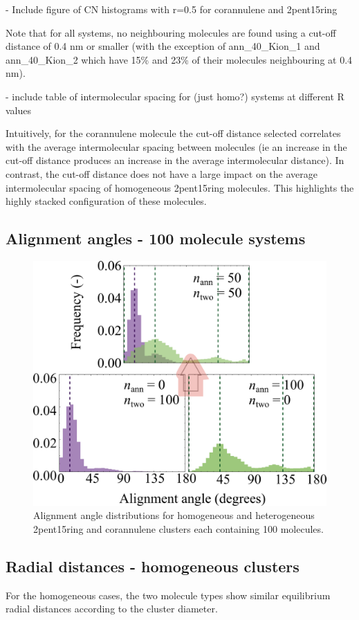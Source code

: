 - Include figure of CN histograms with r=0.5 for corannulene and 2pent15ring

Note that for all systems, no neighbouring molecules are found using a cut-off distance of 0.4 nm or smaller (with the exception of ann\_40\_Kion\_1 and ann\_40\_Kion\_2 which have 15\% and 23\% of their molecules neighbouring at 0.4 nm).

- include table of intermolecular spacing for (just homo?) systems at different R values

Intuitively, for the corannulene molecule the cut-off distance selected correlates with the average intermolecular spacing between molecules (ie an increase in the cut-off distance produces an increase in the average intermolecular distance). %
In contrast, the cut-off distance does not have a large impact on the average intermolecular spacing of homogeneous 2pent15ring molecules.  This highlights the highly stacked configuration of these molecules.



\subsection{Alignment angles - 100 molecule systems}
%
\begin{figure}[!tbh]
\centering
\includegraphics[width=0.5\linewidth]{Figures/alignment_angle_hetero_SI_draft.png}
\caption{Alignment angle distributions for homogeneous and heterogeneous 2pent15ring and corannulene clusters each containing 100 molecules.}
\label{figSI:alignmentangles_hetero}
\end{figure}
%

\subsection{Radial distances - homogeneous clusters}
For the homogeneous cases, the two molecule types show similar equilibrium radial distances according to the cluster diameter.


\newpage